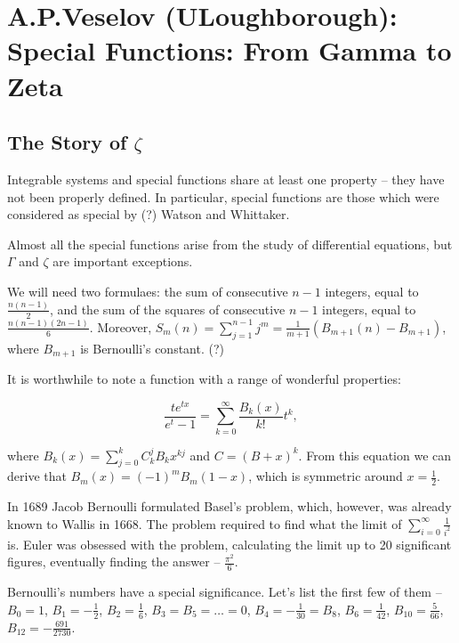 \documentclass[11pt]{scrartcl}
\begin{document}
  \section{A.P.Veselov (ULoughborough): Special Functions: From Gamma to Zeta}
  \subsection{The Story of $\zeta$}

  Integrable systems and special functions share at least one property
  -- they have not been properly defined. In particular, special
  functions are those which were considered as special by (?) Watson
  and Whittaker.

  Almost all the special functions arise from the study of
  differential equations, but $\Gamma$ and $\zeta$ are important
  exceptions.

  We will need two formulaes: the sum of consecutive $n-1$ integers,
  equal to $\frac{n(n-1)}{2}$, and the sum of the squares of
  consecutive $n-1$ integers, equal to $\frac{n(n-1)(2n-1)}{6}$.
  Moreover,
  $S_{m}(n) = \sum_{j=1}^{n-1}j^{m} = \frac{1}{m+1}(B_{m+1}(n) -
  B_{m+1})$, where $B_{m+1}$ is Bernoulli's constant. (?)

  It is worthwhile to note a function with a range of wonderful
  properties:

  \begin{equation}
    \frac{te^{tx}}{e^{t}-1} = \sum_{k=0}^{\infty}\frac{B_{k}(x)}{k!}t^{k},
  \end{equation}

  where $B_{k}(x) = \sum_{j=0}^{k}C_{k}^{j}B_{k}x^{kj}$ and
  $C=(B+x)^{k}$. From this equation we can derive that
  $B_{m}(x) = (-1)^{m}B_{m}(1-x)$, which is symmetric around
  $x=\frac{1}{2}$.
  
  In 1689 Jacob Bernoulli formulated Basel's problem, which, however,
  was already known to Wallis in 1668. The problem required to find
  what the limit of $\sum_{i=0}^{\infty} \frac{1}{i^{2}}$ is. Euler
  was obsessed with the problem, calculating the limit up to 20
  significant figures, eventually finding the answer --
  $\frac{\pi^{2}}{6}$.

  Bernoulli's numbers have a special significance. Let's list the
  first few of them -- $B_{0} = 1$, $B_{1} = -\frac{1}{2}$,
  $B_{2} = \frac{1}{6}$, $B_{3} = B_{5} = \dots = 0$,
  $B_{4} = -\frac{1}{30} = B_{8}$, $B_{6} = \frac{1}{42}$,
  $B_{10} = \frac{5}{66}$, $B_{12} = - \frac{691}{2730}$.
\end{document}

